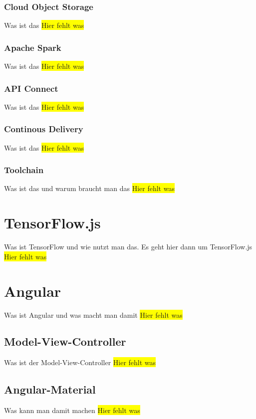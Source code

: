 \subsubsection{Cloud Object Storage}
Was ist das
\colorbox{yellow}{Hier fehlt was}

\subsubsection{Apache Spark}
Was ist das
\colorbox{yellow}{Hier fehlt was}

\subsubsection{API Connect}
Was ist das
\colorbox{yellow}{Hier fehlt was}

\subsubsection{Continous Delivery}
Was ist das
\colorbox{yellow}{Hier fehlt was}

\subsubsection{Toolchain}
Was ist das und warum braucht man das
\colorbox{yellow}{Hier fehlt was}

\section{TensorFlow.js}
Was ist TensorFlow und wie nutzt man das. Es geht hier dann um TensorFlow.js
\colorbox{yellow}{Hier fehlt was}

\section{Angular}
Was ist Angular und was macht man damit
\colorbox{yellow}{Hier fehlt was}

\subsection{Model-View-Controller}
Was ist der Model-View-Controller
\colorbox{yellow}{Hier fehlt was}

\subsection{Angular-Material}
Was kann man damit machen
\colorbox{yellow}{Hier fehlt was}

